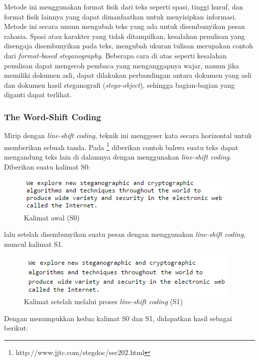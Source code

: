Metode ini menggunakan format fisik dari teks seperti spasi, tinggi huruf, dan format fisik lainnya yang dapat dimanfaatkan untuk menyisipkan informasi. Metode ini secara umum mengubah teks yang ada untuk disembunyikan pesan rahasia. Spasi atau karakter yang tidak ditampilkan, kesalahan penulisan yang disengaja disembunyikan pada teks, mengubah ukuran tulisan merupakan contoh dari \textit{format-based steganography}. Beberapa cara di atas seperti kesalahan penulisan dapat mengecoh pembaca yang menganggapnya wajar, namun jika memiliki dokumen asli, dapat dilakukan perbandingan antara dokumen yang asli dan dokumen hasil steganografi (\textit{stego-object}), sehingga bagian-bagian yang diganti dapat terlihat.

\subsubsection{The Word-Shift Coding}

Mirip dengan \textit{line-shift coding}, teknik ini menggeser kata secara horizontal untuk memberikan sebuah tanda. Pada \footnote{http://www.jjtc.com/stegdoc/sec202.html} diberikan contoh bahwa suatu teks dapat mengandung teks lain di dalamnya dengan menggunakan \textit{line-shift coding}. Diberikan suatu kalimat S0:

\begin{figure}[H]
	\centering
	\includegraphics[scale=1]{Gambar/S0}
	\caption{Kalimat awal (S0)} 
	\label{fig:1-S0}
\end{figure}

lalu setelah disembunyikan suatu pesan dengan menggunakan \textit{line-shift coding}, muncul kalimat S1.

\begin{figure}[H]
	\centering
	\includegraphics[scale=1]{Gambar/S1}
	\caption{Kalimat setelah melalui proses \textit{line-shift coding} (S1)} 
	\label{fig:2-S1}
\end{figure}

Dengan menumpukkan kedua kalimat S0 dan S1, didapatkan hasil sebagai berikut:


